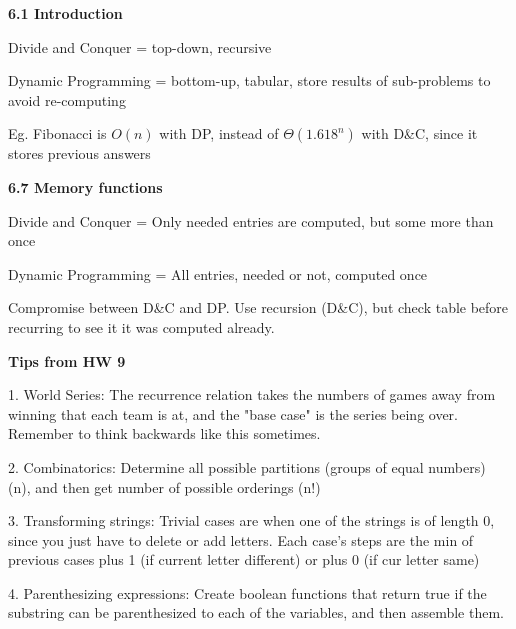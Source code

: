 
\textbf{6.1 Introduction}

Divide and Conquer = top-down, recursive

Dynamic Programming = bottom-up, tabular,
store results of sub-problems to avoid re-computing

Eg. Fibonacci is $O(n)$ with DP, instead of $\Theta(1.618^n)$ with D\&C, since it stores previous answers

\textbf{6.7 Memory functions}

Divide and Conquer = Only needed entries are computed, but some more than once

Dynamic Programming = All entries, needed or not, computed once

Compromise between D\&C and DP. Use recursion (D\&C), but check table before recurring to see it it was computed already.

\textbf{Tips from HW 9}

1. World Series: The recurrence relation takes the numbers of games away from winning that each team is at, and the "base case" is the series being over. Remember to think backwards like this sometimes.

2. Combinatorics: Determine all possible partitions (groups of equal numbers) (n), and then get number of possible orderings (n!)

3. Transforming strings: Trivial cases are when one of the strings is of length 0, since you just have to delete or add letters. Each case's steps are the min of previous cases plus 1 (if current letter different) or plus 0 (if cur letter same)

4. Parenthesizing expressions: Create boolean functions that return true if the substring can be parenthesized to each of the variables, and then assemble them.